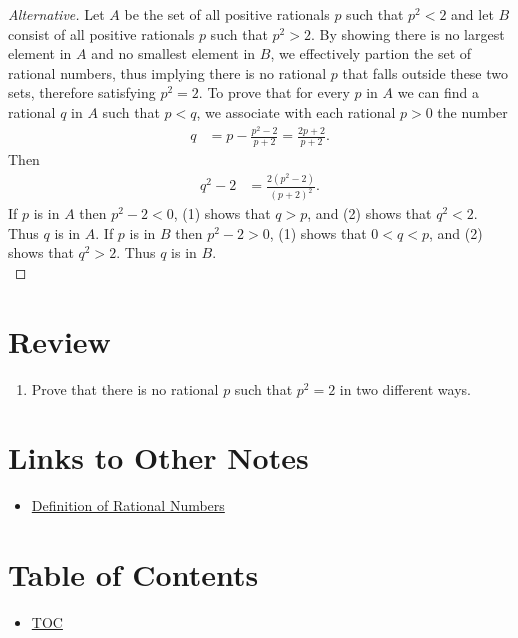 \begin{proof}[Alternative]
 Let $A$ be the set of all positive rationals $p$ such that $p^2 < 2$ and let $B$ consist of all positive rationals $p$ such that $p^2 > 2$. By showing there is no largest element in $A$ and no smallest element in $B$, we effectively partion the set of rational numbers, thus implying there is no rational $p$ that falls outside these two sets, therefore satisfying $p^2 = 2$. To prove that for every $p$ in $A$ we can find a rational $q$ in $A$ such that $p < q$, we associate with each rational $p > 0$ the number 
 \begin{align}
   q &= p - \frac{p^2 - 2}{p + 2} = \frac{2p + 2}{p + 2}.
 \end{align}
 Then
 \begin{align}
   q^2 - 2 &= \frac{2(p^2 - 2)}{(p+2)^2}.
 \end{align}
 If $p$ is in $A$ then $p^2 - 2 < 0$, (1) shows that $q > p$, and (2) shows that $q^2 < 2$. Thus $q$ is in $A$. If $p$ is in $B$ then $p^2 -2 > 0$, (1) shows that $0 < q < p$, and (2) shows that $q^2 > 2$. Thus $q$ is in $B$.\\ 
\end{proof}

\section*{Review}
\begin{enumerate}
  \item Prove that there is no rational $p$ such that $p^2 = 2$ in two different ways.\\
\end{enumerate}


\section*{Links to Other Notes}
\begin{itemize}
  \item \hyperref[202501131947]{Definition of Rational Numbers}
\end{itemize}

\section*{Table of Contents}

\begin{itemize}
  \item \hyperref[toc]{TOC}
\end{itemize}

